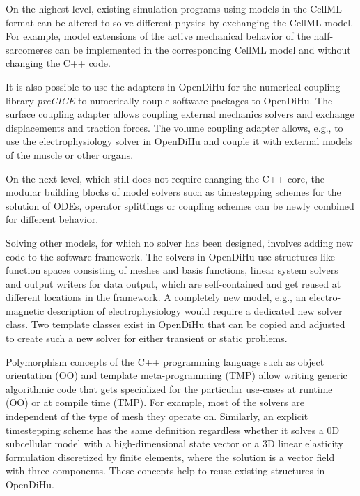 On the highest level, existing simulation programs using models in the CellML format can be altered to solve different physics by exchanging the CellML model. For example, model extensions of the active mechanical behavior of the half-sarcomeres can be implemented in the corresponding CellML model and without changing the C++ code.

It is also possible to use the adapters in OpenDiHu for the numerical coupling library \emph{preCICE} \cite{precice} to numerically couple  software packages to OpenDiHu. The surface coupling adapter allows coupling external mechanics solvers and exchange displacements and traction forces. The volume coupling adapter allows, e.g., to use the electrophysiology solver in OpenDiHu and couple it with external models of the muscle or other organs.

On the next level, which still does not require changing the C++ core, the modular building blocks of model solvers such as timestepping schemes for the solution of ODEs, operator splittings or coupling schemes can be newly combined for different behavior.

Solving other models, for which no solver has been designed, involves adding new code to the software framework.
The solvers in OpenDiHu use structures like function spaces consisting of meshes and basis functions, linear system solvers and output writers for data output, which are self-contained and get reused at different locations in the framework. A completely new model, e.g., an electro-magnetic description of electrophysiology would require a dedicated new solver class. 
Two template classes exist in OpenDiHu that can be copied and adjusted to create such a new solver for either transient or static problems.

Polymorphism concepts of the C++ programming language such as object orientation (OO) and template meta-programming (TMP) allow writing generic algorithmic code that gets specialized for the particular use-cases at runtime (OO) or at compile time (TMP). For example, most of the solvers are independent of the type of mesh they operate on. Similarly, an explicit timestepping scheme has the same definition regardless whether it solves a 0D subcellular model with a high-dimensional state vector or a 3D linear elasticity formulation discretized by finite elements, where the solution is a vector field with three components.
These concepts help to reuse existing structures in OpenDiHu.


